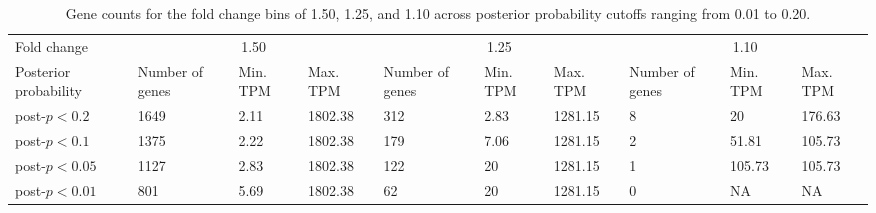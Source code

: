 \begin{table}[h!]
\centering
\caption{Gene counts for the fold change bins of 1.50, 1.25, and 1.10 across posterior probability cutoffs ranging from 0.01 to 0.20.}
\label{tab:c2t1}
\small
\begin{tabular}{|p{2cm}|p{1.25cm}|p{1.25cm}|p{1.25cm}|p{1.25cm}|p{1.25cm}|p{1.25cm}|p{1.25cm}|p{1.25cm}|p{1.25cm}|}
\hline
Fold change & \multicolumn{3}{c|}{1.50}                   & \multicolumn{3}{c|}{1.25}                   & \multicolumn{3}{c|}{1.10}                   \\ \cline{1-10} 
Posterior probability                             & Number of genes & Min. TPM & Max. TPM & Number of genes & Min. TPM & Max. TPM & Number of genes & Min. TPM & Max. TPM \\ \hline
post-$p < 0.2$        & 1649            & 2.11        & 1802.38     & 312             & 2.83        & 1281.15     & 8               & 20          & 176.63      \\ \hline
post-$p < 0.1$         & 1375            & 2.22        & 1802.38     & 179             & 7.06        & 1281.15     & 2               & 51.81       & 105.73      \\ \hline
post-$p < 0.05$       & 1127            & 2.83        & 1802.38     & 122             & 20          & 1281.15     & 1               & 105.73      & 105.73      \\ \hline
post-$p < 0.01$        & 801             & 5.69        & 1802.38     & 62              & 20          & 1281.15     & 0               & NA          & NA          \\ \hline
\end{tabular}
\end{table}


